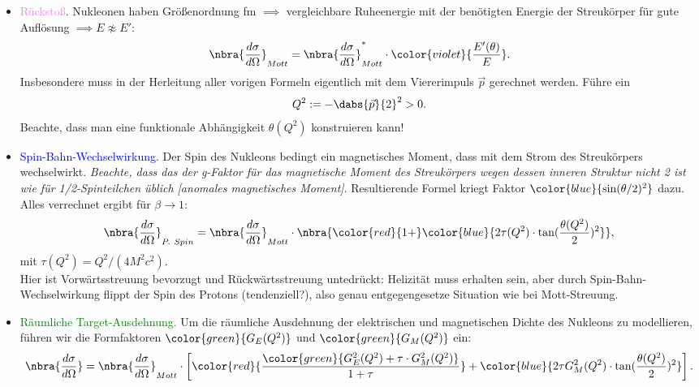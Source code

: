 \documentclass{subfiles}
\begin{document}
                \begin{itemize}
                        \item \textcolor{violet}{Rückstoß}. Nukleonen haben Größenordnung fm $\implies$ vergleichbare Ruheenergie mit der benötigten Energie der Streukörper für gute Auflösung $\implies E\not\approx E'$:
                        \[
                                \nbra{\frac{d\sigma}{d\Omega}}_{Mott} = \nbra{\frac{d\sigma}{d\Omega}}_{Mott}^*\cdot\color{violet}{\frac{E'(\theta)}{E}}.
                        \]
                        Insbesondere muss in der Herleitung aller vorigen Formeln eigentlich mit dem Viererimpuls $\vec{p}$ gerechnet werden. Führe ein 
                        \begin{align*}
                                Q^2 := -\dabs{\vec{p}}{2}^2 > 0.
                        \end{align*}
                        Beachte, dass man eine funktionale Abhängigkeit $\theta(Q^2)$ konstruieren kann!

                        \item \textcolor{blue}{Spin-Bahn-Wechselwirkung}. Der Spin des Nukleons bedingt ein magnetisches Moment, dass mit dem Strom des Streukörpers wechselwirkt. \textit{Beachte, dass das der g-Faktor für das magnetische Moment des Streukörpers wegen dessen inneren Struktur nicht 2 ist wie für 1/2-Spinteilchen üblich [anomales magnetisches Moment]}. Resultierende Formel kriegt Faktor $\color{blue}{\sin(\theta /2)^2}$ dazu. Alles verrechnet ergibt für $\beta\to 1$:
                        \[
                                \nbra{\frac{d\sigma}{d\Omega}}_{P.\ Spin} = \nbra{\frac{d\sigma}{d\Omega}}_{Mott}\cdot\nbra{\color{red}{1 + }\color{blue}{{2\tau(Q^2)\cdot\tan(\frac{\theta(Q^2)}{2})^2}}},
                        \]
                        mit $\tau(Q^2) = Q^2/ (4M^2c^2)$.\\

                        Hier ist Vorwärtsstreuung bevorzugt und Rückwärtsstreuung untedrückt: Helizität muss erhalten sein, aber durch Spin-Bahn-Wechselwirkung flippt der Spin des Protons (tendenziell?), also genau entgegengesetze Situation wie bei Mott-Streuung.

                        \item \textcolor{green}{Räumliche Target-Ausdehnung.} Um die räumliche Ausdehnung der elektrischen und magnetischen Dichte des Nukleons zu modellieren, führen wir die Formfaktoren $\color{green}{G_E(Q^2)}$ und $\color{green}{G_M(Q^2)}$ ein:
                        \[
                                \nbra{\frac{d\sigma}{d\Omega}} = \nbra{\frac{d\sigma}{d\Omega}}_{Mott}\cdot\left[\color{red}{\frac{\color{green}{G_E^2(Q^2) + \tau\cdot G_M^2(Q^2)}}{1 + \tau}} + \color{blue}{2\tau G_M^2(Q^2)\cdot\tan(\frac{\theta(Q^2)}{2})^2}\right].
                        \]
                \end{itemize}
\end{document}
